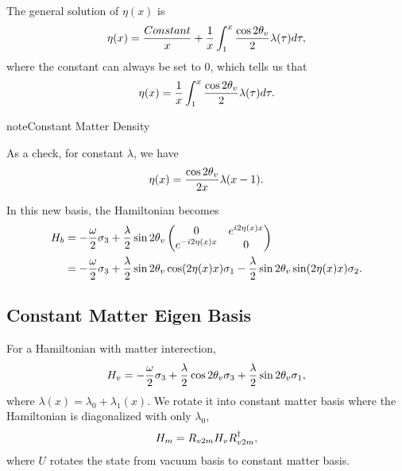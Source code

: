 \documentclass[letterpaper,12pt,english]{sphinxmanual}
\begin{document}
The general solution of \(\eta(x)\) is
\begin{gather}
\begin{split}\eta(x) = \frac{Constant}{x} + \frac{1}{x} \int_1^x \frac{\cos 2\theta_v}{2} \lambda(\tau) d\tau,\end{split}\notag
\end{gather}
where the constant can always be set to 0, which tells us that
\begin{gather}
\begin{split}\eta(x) = \frac{1}{x} \int_1^x \frac{\cos 2\theta_v}{2} \lambda(\tau) d\tau .\end{split}\notag
\end{gather}
\begin{notice}{note}{Constant Matter Density}

As a check, for constant \(\lambda\), we have
\begin{gather}
\begin{split}\eta(x) = \frac{\cos 2\theta_v }{2x} \lambda ( x-1 ).\end{split}\notag
\end{gather}\end{notice}

In this new basis, the Hamiltonian becomes
\begin{gather}
\begin{split}H_b &= - \frac{\omega}{2} \sigma_3 + \frac{\lambda}{2} \sin 2\theta_v \begin{pmatrix} 0 & e^{i 2\eta(x) x} \\ e^{ - i 2\eta(x) x} & 0  \end{pmatrix} \\
& =  - \frac{\omega}{2} \sigma_3 + \frac{\lambda}{2}\sin 2\theta_v \cos ( 2\eta(x) x )\sigma_1 - \frac{\lambda}{2} \sin 2\theta_v \sin (2\eta(x) x) \sigma_2.\end{split}\notag
\end{gather}

\subsection{Constant Matter Eigen Basis}
\label{basis:constant-matter-eigen-basis}
For a Hamiltonian with matter interection,
\begin{gather}
\begin{split}H_v = -\frac{\omega}{2} \sigma_3 + \frac{\lambda}{2}\cos 2\theta_v \sigma_3 + \frac{\lambda}{2} \sin 2\theta_v \sigma_1,\end{split}\notag
\end{gather}
where \(\lambda(x) = \lambda_0 + \lambda_1(x)\). We rotate it into constant matter basis where the Hamiltonian is diagonalized with only \(\lambda_0\),
\begin{gather}
\begin{split}H_m = R_{v2m} H_v R_{v2m}^\dagger,\end{split}\notag
\end{gather}
where \(U\) rotates the state from vacuum basis to constant matter basis.
\end{document}
